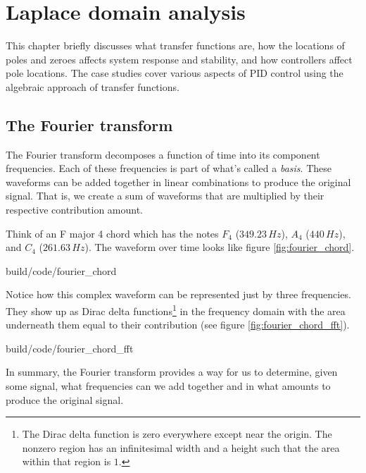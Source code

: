 
\chapter{Laplace domain analysis}

This chapter briefly discusses what transfer functions are, how the locations of
poles and zeroes affects system response and stability, and how controllers
affect pole locations. The case studies cover various aspects of PID control
using the algebraic approach of transfer functions.

\section{The Fourier transform}

The Fourier transform decomposes a function of time into its component
frequencies. Each of these frequencies is part of what's called a
\textit{basis}. These waveforms can be added together in linear combinations to
produce the original signal. That is, we create a sum of waveforms that are
multiplied by their respective contribution amount.

Think of an F major 4 chord which has the notes $F_4$ ($349.23\,Hz$), $A_4$
($440\,Hz$), and $C_4$ ($261.63\,Hz$). The waveform over time looks like figure
\ref{fig:fourier_chord}.

\begin{svg}{build/code/fourier_chord}
  \caption{Frequency decomposition of Fmajor4 chord}
  \label{fig:fourier_chord}
\end{svg}

Notice how this complex waveform can be represented just by three frequencies.
They show up as Dirac delta functions\footnote{The Dirac delta function is zero
everywhere except near the origin. The nonzero region has an infinitesimal width
and a height such that the area within that region is $1$.} in the frequency
domain with the area underneath them equal to their contribution (see figure
\ref{fig:fourier_chord_fft}).

\begin{svg}{build/code/fourier_chord_fft}
  \caption{Fourier transform of Fmajor4 chord}
  \label{fig:fourier_chord_fft}
\end{svg}

In summary, the Fourier transform provides a way for us to determine, given some
signal, what frequencies can we add together and in what amounts to produce the
original signal.

